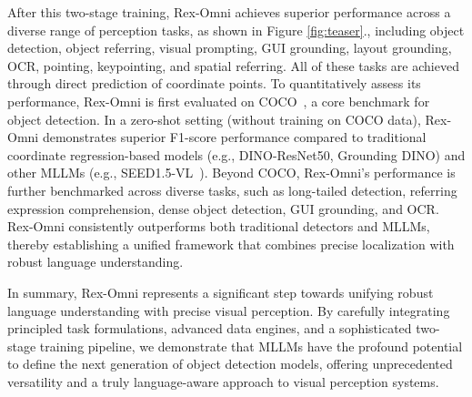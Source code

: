 After this two-stage training, Rex-Omni achieves superior performance across a diverse range of perception tasks, as shown in Figure \ref{fig:teaser}., including object detection, object referring, visual prompting, GUI grounding, layout grounding, OCR, pointing, keypointing, and spatial referring. All of these tasks are achieved through direct prediction of coordinate points. To quantitatively assess its performance, Rex-Omni is first evaluated on COCO~\cite{lin2014microsoft}, a core benchmark for object detection. In a zero-shot setting (without training on COCO data), Rex-Omni demonstrates superior F1-score performance compared to traditional coordinate regression-based models (e.g., DINO-ResNet50, Grounding DINO) and other MLLMs (e.g., SEED1.5-VL~\cite{guo2025seed1}). Beyond COCO, Rex-Omni's performance is further benchmarked across diverse tasks, such as long-tailed detection, referring expression comprehension, dense object detection, GUI grounding, and OCR. Rex-Omni consistently outperforms both traditional detectors and MLLMs, thereby establishing a unified framework that combines precise localization with robust language understanding.

In summary, Rex-Omni represents a significant step towards unifying robust language understanding with precise visual perception. By carefully integrating principled task formulations, advanced data engines, and a sophisticated two-stage training pipeline, we demonstrate that MLLMs have the profound potential to define the next generation of object detection models, offering unprecedented versatility and a truly language-aware approach to visual perception systems.